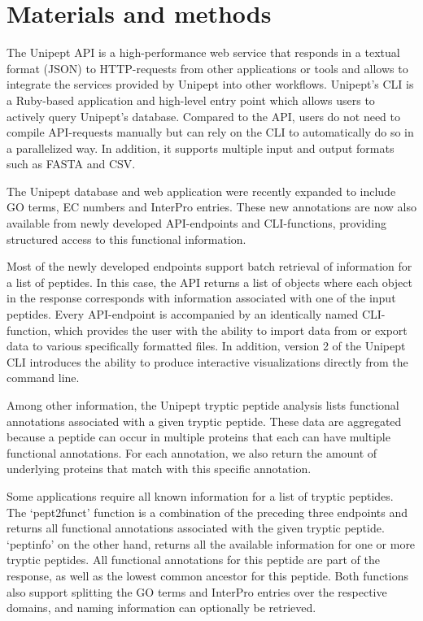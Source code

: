 \hypertarget{materials-and-methods}{%
\section{Materials and methods}\label{materials-and-methods}}

The Unipept API is a high-performance web service that responds in a
textual format (JSON) to HTTP-requests from other applications or tools
and allows to integrate the services provided by Unipept into other
workflows. Unipept's CLI is a Ruby-based application and high-level
entry point which allows users to actively query Unipept's database.
Compared to the API, users do not need to compile API-requests manually
but can rely on the CLI to automatically do so in a parallelized way. In
addition, it supports multiple input and output formats such as FASTA
and CSV.

The Unipept database and web application were recently expanded to
include GO terms, EC numbers and InterPro entries. These new annotations
are now also available from newly developed API-endpoints and
CLI-functions, providing structured access to this functional
information.

Most of the newly developed endpoints support batch retrieval of
information for a list of peptides. In this case, the API returns a list
of objects where each object in the response corresponds with
information associated with one of the input peptides. Every
API-endpoint is accompanied by an identically named CLI-function, which
provides the user with the ability to import data from or export data to
various specifically formatted files. In addition, version 2 of the
Unipept CLI introduces the ability to produce interactive visualizations
directly from the command line.

Among other information, the Unipept tryptic peptide analysis lists
functional annotations associated with a given tryptic peptide. These
data are aggregated because a peptide can occur in multiple proteins
that each can have multiple functional annotations. For each annotation,
we also return the amount of underlying proteins that match with this
specific annotation.

Some applications require all known information for a list of tryptic
peptides. The `pept2funct' function is a combination of the preceding
three endpoints and returns all functional annotations associated with
the given tryptic peptide. `peptinfo' on the other hand, returns all the
available information for one or more tryptic peptides. All functional
annotations for this peptide are part of the response, as well as the
lowest common ancestor for this peptide. Both functions also support
splitting the GO terms and InterPro entries over the respective domains,
and naming information can optionally be retrieved.

